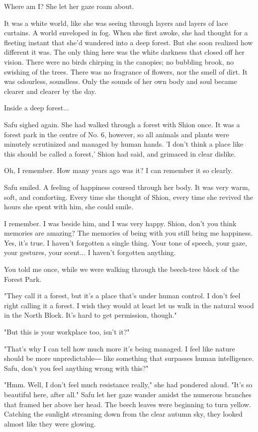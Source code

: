 Where am I? She let her gaze roam about.

It was a white world, like she was seeing through layers and layers of
lace curtains. A world enveloped in fog. When she first awoke, she had
thought for a fleeting instant that she'd wandered into a deep forest.
But she soon realized how different it was. The only thing here was the
white darkness that closed off her vision. There were no birds chirping
in the canopies; no bubbling brook, no swishing of the trees. There was
no fragrance of flowers, nor the smell of dirt. It was odourless,
soundless. Only the sounds of her own body and soul became clearer and
clearer by the day.

Inside a deep forest...

Safu sighed again. She had walked through a forest with Shion once. It
was a forest park in the centre of No. 6, however, so all animals and
plants were minutely scrutinized and managed by human hands. 'I don't
think a place like this should be called a forest,' Shion had said, and
grimaced in clear dislike.

Oh, I remember. How many years ago was it? I can remember it so clearly.

Safu smiled. A feeling of happiness coursed through her body. It was
very warm, soft, and comforting. Every time she thought of Shion, every
time she revived the hours she spent with him, she could smile.

I remember. I was beside him, and I was very happy. Shion, don't you
think memories are amazing? The memories of being with you still bring
me happiness. Yes, it's true. I haven't forgotten a single thing. Your
tone of speech, your gaze, your gestures, your scent... I haven't
forgotten anything.

You told me once, while we were walking through the beech-tree block of
the Forest Park.

"They call it a forest, but it's a place that's under human control. I
don't feel right calling it a forest. I wish they would at least let us
walk in the natural wood in the North Block. It's hard to get
permission, though."

"But this is your workplace too, isn't it?"

"That's why I can tell how much more it's being managed. I feel like
nature should be more unpredictable― like something that surpasses human
intelligence. Safu, don't you feel anything wrong with this?"

"Hmm. Well, I don't feel much resistance really," she had pondered
aloud. "It's so beautiful here, after all." Safu let her gaze wander
amidst the numerous branches that framed her above her head. The beech
leaves were beginning to turn yellow. Catching the sunlight streaming
down from the clear autumn sky, they looked almost like they were
glowing.

